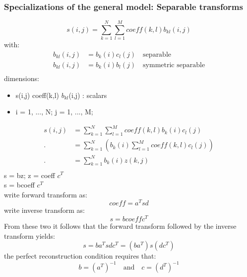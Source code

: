 \documentclass{article}
\begin{document}
\subsubsection{Specializations of the general model: Separable transforms}
\begin{equation}
    s(i, j) = \sum_{k=1}^{N}\sum_{l=1}^{M}coeff(k, l) b_{kl}(i,j)
\end{equation}
with:
\begin{equation}
    \begin{split}
        b_{kl}(i,j) &= b_k(i)c_l(j) \quad \textrm{separable} \\
        b_{kl}(i,j) &= b_k(i) b_l(j) \quad \textrm{symmetric separable} \\
    \end{split}
\end{equation}
dimensions:
\begin{itemize}
    \item s(i,j) coeff(k,l) $b_{kl}$(i,j) : scalars
    \item i = 1, ..., N; j = 1, ..., M;
\end{itemize}
\begin{equation}
    \begin{split}
        s(i,j) &= \sum_{k=1}^{N}\sum_{l=1}^{M}coeff(k,l) b_k(i) c_l(j) \\
       . &= \sum_{k=1}^{N}\left( b_k(i) \sum_{l=1}^{M}coeff(k,l) c_l(j)\right)\\
         . &= \sum_{k=1}^{N} b_k(i) z(k, j) \\
    \end{split}
\end{equation}
s = bz; z = coeff $c^T$ \\
s = bcoeff $c^T$ \\
write forward transform as:
\begin{equation}
    coeff = a^T s d
\end{equation}
write inverse transform as:
\begin{equation}
    s = b coeff c^T
\end{equation}
From these two it follows that the forward transform followed by the inverse transform yields:
\begin{equation}
    s = b a^T s d c^T = \left(b a^T\right) s \left(d c^T\right)
\end{equation}
the perfect reconstruction condition requires that:
\begin{equation}
    b = (a^T)^{-1} \quad \textrm{and} \quad c = (d^T)^{-1}
\end{equation}
\end{document}
